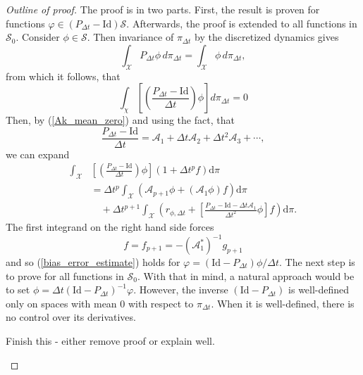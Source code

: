\documentclass{article}
\newcommand{\Id}{\mathrm{Id}}
\begin{document}
\begin{proof} [Outline of proof]
    The proof is in two parts. First, the result is proven for functions $\varphi \in (P_{\Delta t} - \Id)\mathcal{S}.$ Afterwards, the proof is extended to all functions in $\mathcal{S}_0$. Consider $\phi \in \mathcal{S}$. Then invariance of $\pi_{\Delta t}$ by the discretized dynamics gives
    \[
    \int_{\mathcal{X}} P_{\Delta t} \phi \, d\pi_{\Delta t} = \int_{\mathcal{X}} \phi \, d\pi_{\Delta t},
    \]
    from which it follows, that
    $$
        \int_\chi\left[\left(\frac{P_{\Delta t}-\mathrm{Id}}{\Delta t}\right) \phi\right] d \pi_{\Delta t} = 0
    $$
    Then, by (\ref{Ak_mean_zero}) and using the fact, that
    \[
    \frac{P_{\Delta t} - \mathrm{Id}}{\Delta t} = \mathcal{A}_1 + \Delta t \mathcal{A}_2 + \Delta t^2 \mathcal{A}_3 + \cdots,
    \]
    we can expand
    $$
    \begin{aligned}
        \int_{\mathcal{X}} & {\left[\left(\frac{P_{\Delta t}-\mathrm{Id}}{\Delta t}\right) \phi\right]\left(1+\Delta t^p f\right) \mathrm{d} \pi } \\
        & =\Delta t^p \int_{\mathcal{X}}\left(\mathcal{A}_{p+1} \phi+\left(\mathcal{A}_1 \phi\right) f\right) \mathrm{d} \pi \\
        & \quad+\Delta t^{p+1} \int_{\mathcal{X}}\left(r_{\phi, \Delta t}+\left[\frac{P_{\Delta t}-\mathrm{Id}-\Delta t \mathcal{A}_1}{\Delta t^2} \phi\right] f\right) \mathrm{d} \pi .
    \end{aligned}
    $$
    The first integrand on the right hand side forces
    \[f = f_{p+1} = -(\mathcal{A}_1^*)^{-1} g_{p+1}\]
    and so (\ref{bias_error_estimate}) holds for $\varphi = (\Id - P_{\Delta t})\phi / \Delta t$. The next step is to prove for all functions in $\mathcal{S}_0$. With that in mind, a natural approach would be to set $\phi = \Delta t (\Id - P_{\Delta t})^{-1} \varphi$. However, the inverse $(\Id - P_{\Delta t})$ is well-defined only on spaces with mean 0 with respect to $\pi_{\Delta t}$. When it is well-defined, there is no control over its derivatives.
    \begin{mdframed}[hidealllines=true,backgroundcolor=yellow!20]
    Finish this - either remove proof or explain well.
    \end{mdframed}
\end{proof}




\end{document}
